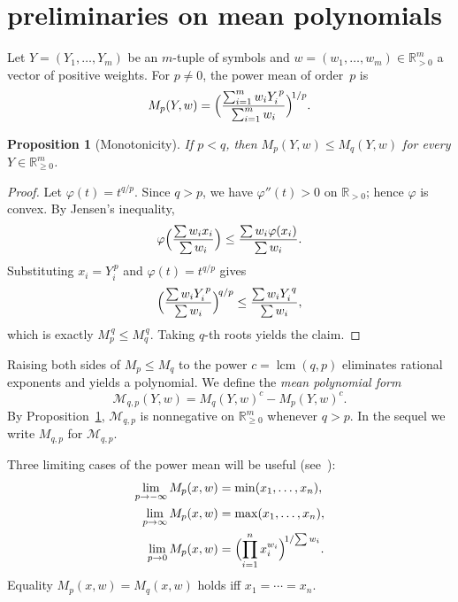 \documentclass{amsart}
\newtheorem{prop}[thm]{Proposition}
\theoremstyle{definition}
\numberwithin{equation}{section}
\newcommand{\reals}{\mathbb{R}}
\begin{document}
\section{preliminaries on mean polynomials}\label{sec:prelim}

Let $Y=(Y_1,\dots,Y_m)$ be an $m$-tuple of symbols and
$w=(w_1,\dots,w_m)\in\reals_{>0}^m$ a vector of positive weights.
For $p\neq0$, the power mean of order~$p$ is
\[
M_p(Y,w)=\Bigl(\frac{\sum_{i=1}^m w_i Y_i^{\,p}}{\sum_{i=1}^m w_i}\Bigr)^{\!1/p}.
\]

\begin{prop}[Monotonicity]\label{prop:monotonicity}
If $p<q$, then $M_p(Y,w)\le M_q(Y,w)$ for every $Y\in\reals_{\ge0}^m$.
\end{prop}

\begin{proof}
Let $\varphi(t)=t^{q/p}$.  Since $q>p$, we have $\varphi''(t)>0$ on
$\reals_{>0}$; hence $\varphi$ is convex.  By Jensen's inequality,
\[
\varphi\Bigl(\frac{\sum w_i x_i}{\sum w_i}\Bigr)
\le\frac{\sum w_i\varphi(x_i)}{\sum w_i}.
\]
Substituting $x_i=Y_i^{\,p}$ and $\varphi(t)=t^{q/p}$ gives
\[
\Bigl(\frac{\sum w_i Y_i^{\,p}}{\sum w_i}\Bigr)^{\!q/p}
\le\frac{\sum w_i Y_i^{\,q}}{\sum w_i},
\]
which is exactly $M_p^{\,q}\le M_q^{\,q}$.  Taking $q$-th roots yields the
claim.
\end{proof}

\medskip
Raising both sides of $M_p\le M_q$ to the power
$c=\operatorname{lcm}(q,p)$ eliminates rational exponents and yields a
polynomial.  We define the \emph{mean polynomial form}
\begin{equation}\label{eq:mean-poly}
\mathcal{M}_{q,p}(Y,w)=M_q(Y,w)^c-M_p(Y,w)^c.
\end{equation}
By Proposition~\ref{prop:monotonicity}, $\mathcal{M}_{q,p}$ is nonnegative
on $\reals_{\ge0}^m$ whenever $q>p$.  In the sequel we write
$M_{q,p}$ for $\mathcal{M}_{q,p}$.

Three limiting cases of the power mean will be useful
(see~\cite[Chapter~II]{HLP52}):
\begin{align*}
\lim_{p\to-\infty}M_p(x,w)&=\min(x_1,\dots,x_n),\\
\lim_{p\to\infty}M_p(x,w)&=\max(x_1,\dots,x_n),\\
\lim_{p\to0}M_p(x,w)&=\Bigl(\prod_{i=1}^n x_i^{w_i}\Bigr)^{\!1/\!\sum w_i}.
\end{align*}
Equality $M_p(x,w)=M_q(x,w)$ holds iff $x_1=\cdots=x_n$.
\end{document}
